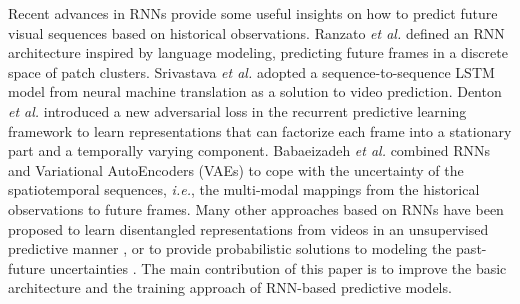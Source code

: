 \documentclass[10pt,journal,compsoc]{IEEEtran}
\begin{document}
Recent advances in RNNs provide some useful insights on how to predict future visual sequences based on historical observations. 
Ranzato \textit{et al.} \cite{Ranzato2014Video} defined an RNN architecture inspired by language modeling, predicting future frames in a discrete space of patch clusters. 
Srivastava \textit{et al.} \cite{srivastava2015unsupervised} adopted a sequence-to-sequence LSTM model from neural machine translation \cite{Sutskever2011Generating} as a solution to video prediction. 
Denton \textit{et al.} \cite{denton2017unsupervised} introduced a new adversarial loss in the recurrent predictive learning framework to learn representations that can factorize each frame into a stationary part and a temporally varying component. 
Babaeizadeh \textit{et al.} \cite{babaeizadeh2017stochastic} combined RNNs and Variational AutoEncoders (VAEs) to cope with the uncertainty of the spatiotemporal sequences, \textit{i.e.}, the multi-modal mappings from the historical observations to future frames. 
Many other approaches based on RNNs have been proposed to learn disentangled representations from videos in an unsupervised predictive manner \cite{Villegas2017Decomposing,hsieh2018learning,guen2020disentangling}, or to provide probabilistic solutions to modeling the past-future uncertainties \cite{denton2018stochastic,lee2018stochastic,villegas2019high,castrejon2019improved,franceschi2020stochastic}.
The main contribution of this paper is to improve the basic architecture and the training approach of RNN-based predictive models.
\end{document}
